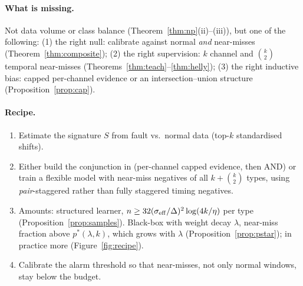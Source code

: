 \documentclass[11pt]{article}
\theoremstyle{definition}
\theoremstyle{remark}
\newcommand{\1}{\mathbf{1}}
\begin{document}
\paragraph{What is missing.} Not data volume or class balance (Theorem~\ref{thm:np}(ii)--(iii)), but one of the following:
(1) the right null: calibrate against normal \emph{and} near-misses (Theorem~\ref{thm:composite});
(2) the right supervision: $k$ channel and $\binom k2$ temporal near-misses (Theorems~\ref{thm:teach}--\ref{thm:helly});
(3) the right inductive bias: capped per-channel evidence or an intersection--union structure (Proposition~\ref{prop:cap}).

\paragraph{Recipe.}
\begin{enumerate}[leftmargin=*]
\item Estimate the signature $S$ from fault vs.\ normal data (top-$k$ standardised shifts).
\item Either build the conjunction in (per-channel capped evidence, then AND) or train a flexible model with near-miss negatives of all $k+\binom k2$ types, using \emph{pair}-staggered rather than fully staggered timing negatives.
\item Amounts: structured learner, $n\ge32(\sigma_{\rm eff}/\Delta)^2\log(4k/\eta)$ per type (Proposition~\ref{prop:samples}). Black-box with weight decay $\lambda$, near-miss fraction above $p^*(\lambda,k)$, which grows with $\lambda$ (Proposition~\ref{prop:pstar}); in practice more (Figure~\ref{fig:recipe}).
\item Calibrate the alarm threshold so that near-misses, not only normal windows, stay below the budget.
\end{enumerate}

\end{document}
